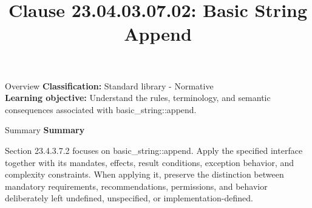 \documentclass[10pt,letterpaper]{article}
\title{Clause 23.04.03.07.02: Basic String Append}
\author{}
\date{}
\begin{document}
\maketitle
\begin{CornellOverviewBox}{Overview}
\textbf{Classification:} Standard library - Normative\\[2pt]
\textbf{Learning objective:} Understand the rules, terminology, and semantic consequences associated with basic\_string::append.
\end{CornellOverviewBox}\begin{CornellSummaryBox}{Summary}
{\sffamily\bfseries\color{Accent} Summary}\par\vspace{3pt}Section 23.4.3.7.2 focuses on basic\_string::append. Apply the specified interface together with its mandates, effects, result conditions, exception behavior, and complexity constraints. When applying it, preserve the distinction between mandatory requirements, recommendations, permissions, and behavior deliberately left undefined, unspecified, or implementation-defined.
\end{CornellSummaryBox}
\end{document}
